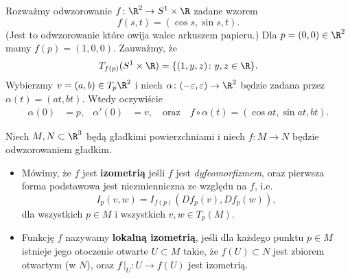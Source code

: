 \begin{frame}

\begin{przyklad}\label{ex:differential}
Rozważmy odwzorowanie $f\colon \R^2\to S^1\times \R$ zadane wzorem \[f(s,t)=(\cos s,\sin s,t).\]
(Jest to odwzorowanie które owija walec arkuszem papieru.) \pause Dla 
$p=(0,0)\in \R^2$ mamy $f(p)=(1,0,0)$. Zauważmy, że \[T_{f(p)}(S^1 \times 
\R)=\{(1,y,z)\colon y,z\in \R \}.\]
\pause Wybierzmy $v=(a,b)\in T_p\R^2$ i niech $\alpha\colon (-\varepsilon,\varepsilon)\to\R^2$ będzie zadana przez $\alpha(t)=(at,bt)$. Wtedy oczywiście
\begin{align*}
\alpha(0)&=p, &
\alpha'(0)&=v, \quad\text{oraz}\quad
f\circ \alpha (t)=(\cos at,\sin at, bt).
\end{align*}\pause
{}
\end{przyklad}

\end{frame}
\begin{frame}[<+->]

\begin{definicja}
Niech $M,N\subset \R^3$ będą gładkimi powierzchniami i niech $f\colon M\to N$ będzie odwzorowaniem gładkim.
\begin{itemize}
\item Mówimy, że $f$ jest \textbf{izometrią} jeśli $f$ jest \emph{dyfeomorfizmem}, oraz pierwsza forma podstawowa jest niezmienniczna ze względu na $f$, i.e. \[I_p(v,w)=I_{f(p)}(Df_p(v),Df_p(w)),\] dla wszystkich $p\in M$ i wszystkich $v,w\in T_p(M)$.

\item Funkcję $f$ nazywamy \textbf{lokalną izometrią}, jeśli dla każdego punktu $p\in M$ istnieje jego otoczenie otwarte $U\subset M$ takie, że $f(U)\subset N$ jest zbiorem otwartym (w $N$), oraz $f\,\big|_U\colon U\to f(U)$ jest izometrią.
\end{itemize}

\end{definicja}
\end{frame}
